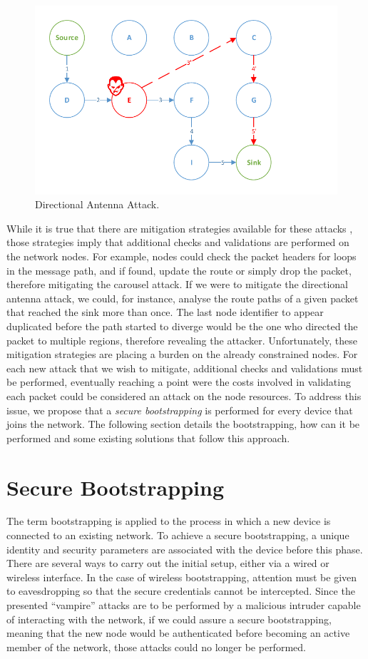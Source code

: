 \documentclass{llncs}
\begin{document}
\begin{figure}[h]
  \centering
  \includegraphics[width=0.8\linewidth]{figures/Directional_Antenna_Attack.pdf}
  \caption{Directional Antenna Attack.}
  \label{fig:directional_antenna_attack}
\end{figure}

While it is true that there are mitigation strategies available for these attacks \cite{Vasserman2013}, those strategies imply that additional checks and validations are performed on the network nodes.
For example, nodes could check the packet headers for loops in the message path, and if found, update the route or simply drop the packet, therefore mitigating the carousel attack. 
If we were to mitigate the directional antenna attack, we could, for instance, analyse the route paths of a given packet that reached the sink more than once. 
The last node identifier to appear duplicated before the path started to diverge would be the one who directed the packet to multiple regions, therefore revealing the attacker. 
Unfortunately, these mitigation strategies are placing a burden on the already constrained nodes. 
For each new attack that we wish to mitigate, additional checks and validations must be performed, eventually reaching a point were the costs involved in validating each packet could be considered an attack on the node resources. 
To address this issue, we propose that a \emph{secure bootstrapping} is performed for every device that joins the network. 
The following section details the bootstrapping, how can it be performed and some existing solutions that follow this approach.

\section{Secure Bootstrapping}
\label{sec:secure_bootstrapping}
The term bootstrapping is applied to the process in which a new device is connected to an existing network. 
To achieve a secure bootstrapping, a unique identity and security parameters are associated with the device before this phase. 
There are several ways to carry out the initial setup, either via a wired or wireless interface. 
In the case of wireless bootstrapping, attention must be given to eavesdropping so that the secure credentials cannot be intercepted.
Since the presented ``vampire'' attacks are to be performed by a malicious intruder capable of interacting with the network, if we could assure a secure bootstrapping, meaning that the new node would be authenticated before becoming an active member of the network, those attacks could no longer be performed.
\end{document}
